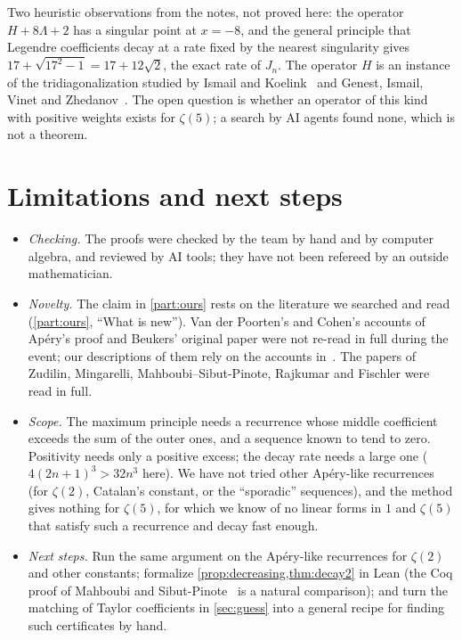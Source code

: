 \documentclass[11pt]{article}
\theoremstyle{plain}
\theoremstyle{definition}
\theoremstyle{remark}
\begin{document}
Two heuristic observations from the notes, not proved here: the operator $H+8\Lambda+2$ has a singular
point at $x=-8$, and the general principle that Legendre coefficients decay at a rate fixed by the
nearest singularity gives $17+\sqrt{17^2-1}=17+12\sqrt2$, the exact rate of $J_n$. The
operator $H$ is an instance of the tridiagonalization studied by Ismail and Koelink~\cite{ismailkoelink}
and Genest, Ismail, Vinet and Zhedanov~\cite{givz}. The open question is whether an operator of this
kind with positive weights exists for $\zeta(5)$; a search by AI agents found none, which is not a
theorem.

\section{Limitations and next steps}\label{sec:limits}

\begin{itemize}
  \item \emph{Checking.} The proofs were checked by the team by hand and by computer algebra, and
    reviewed by AI tools; they have not been refereed by an outside mathematician.
  \item \emph{Novelty.} The claim in \cref{part:ours} rests on the literature we searched and read
    (\cref{part:ours}, ``What is new''). Van der Poorten's and Cohen's accounts of Ap\'ery's proof
    and Beukers' original paper were not re-read in full during the event; our descriptions of them
    rely on the accounts in~\cite{mahboubi,mingarelli}. The papers of Zudilin, Mingarelli,
    Mahboubi--Sibut-Pinote, Rajkumar and Fischler were read in full.
  \item \emph{Scope.} The maximum principle needs a recurrence whose middle coefficient exceeds
    the sum of the outer ones, and a sequence known to tend to zero. Positivity needs only a
    positive excess; the decay rate needs a large one ($4(2n+1)^3>32n^3$ here). We have not tried other Ap\'ery-like recurrences (for
    $\zeta(2)$, Catalan's constant, or the ``sporadic'' sequences), and the method gives nothing for
    $\zeta(5)$, for which we know of no linear forms in $1$ and $\zeta(5)$ that satisfy such a recurrence
    and decay fast enough.
  \item \emph{Next steps.} Run the same argument on the Ap\'ery-like recurrences for $\zeta(2)$ and
    other constants; formalize \cref{prop:decreasing,thm:decay2} in Lean (the Coq proof of
    Mahboubi and Sibut-Pinote~\cite{mahboubi} is a natural comparison); and turn the matching of
    Taylor coefficients in \cref{sec:guess} into a general recipe for finding such certificates by
    hand.
\end{itemize}
\end{document}
